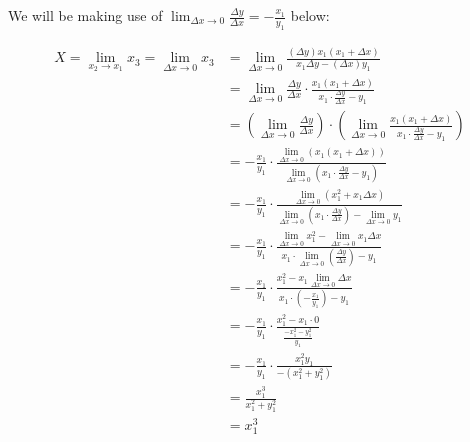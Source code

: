 \documentclass[9pt]{article}
\begin{document}
We will be making use of $\lim_{\Delta x \rightarrow 0} \frac{\Delta y}{\Delta x} = -\frac{x_1}{y_1}$ below:

\begin{align*}
X = \lim_{x_2 \rightarrow x_1} x_3 = \lim_{\Delta x \rightarrow 0} x_3 &= \lim_{\Delta x \rightarrow 0} \frac{(\Delta y) x_1 (x_1 + \Delta x)}{x_1 \Delta y - (\Delta x) y_1} \\
                                                                       &= \lim_{\Delta x \rightarrow 0} \frac{\Delta y}{\Delta x} \cdot \frac{x_1 (x_1 + \Delta x)}{x_1 \cdot \frac{\Delta y}{\Delta x} - y_1} \\
                                                                       &= (\lim_{\Delta x \rightarrow 0} \frac{\Delta y}{\Delta x}) \cdot (\lim_{\Delta x \rightarrow 0}\frac{x_1 (x_1 + \Delta x)}{x_1 \cdot \frac{\Delta y}{\Delta x} - y_1}) \\
                                                                       &= -\frac{x_1}{y_1} \cdot \frac{\lim_{\Delta x \rightarrow 0}(x_1 (x_1 + \Delta x))}{\lim_{\Delta x \rightarrow 0}(x_1 \cdot \frac{\Delta y}{\Delta x} - y_1)} \\
                                                                       &= -\frac{x_1}{y_1} \cdot \frac{\lim_{\Delta x \rightarrow 0} (x_1^2 + x_1 \Delta x)}{\lim_{\Delta x \rightarrow 0} (x_1 \cdot \frac{\Delta y}{\Delta x}) - \lim_{\Delta x \rightarrow 0} y_1} \\
                                                                       &= -\frac{x_1}{y_1} \cdot \frac{\lim_{\Delta x \rightarrow 0} x_1^2 - \lim_{\Delta x \rightarrow 0} x_1 \Delta x}{x_1 \cdot \lim_{\Delta x \rightarrow 0} (\frac{\Delta y}{\Delta x}) - y_1} \\
                                                                       &= -\frac{x_1}{y_1} \cdot \frac{x_1^2 - x_1 \lim_{\Delta x \rightarrow 0} \Delta x}{x_1 \cdot (-\frac{x_1}{y_1}) - y_1} \\
                                                                       &= -\frac{x_1}{y_1} \cdot \frac{x_1^2 - x_1 \cdot 0}{\frac{-x_1^2 - y_1^2}{y_1}} \\
                                                                       &= -\frac{x_1}{y_1} \cdot \frac{x_1^2 y_1}{-(x_1^2 + y_1^2)} \\
                                                                       &= \frac{x_1^3}{x_1^2 + y_1^2} \\
                                                                       &= x_1^3 \tag*{(Ladder $L_1$ has length $x_1^2 + y_1^2 = 1$)}
\end{align*}
\end{document}
